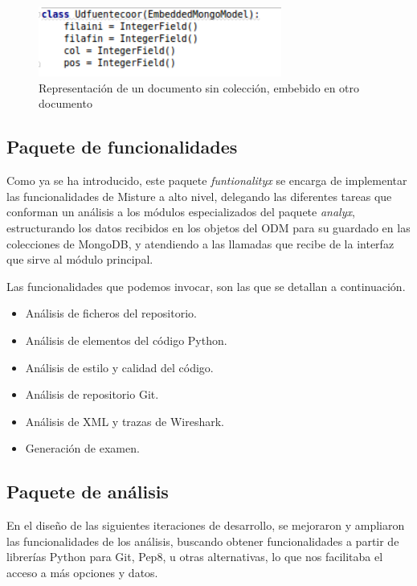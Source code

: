 \begin{figure}[H]
   \centering
   \includegraphics[width=8cm]{img/Selection_027_mongoembdoc}
   \caption{Representación de un documento sin colección, embebido en otro documento}
   \label{figura:mon_emb}
\end{figure}


\subsection{Paquete de funcionalidades} 
\label{subsec:paq_functs}

Como ya se ha introducido, este paquete \textit{funtionalityx} se encarga de implementar las funcionalidades de Misture a alto nivel, delegando las diferentes tareas que conforman un análisis a los módulos especializados del paquete \textit{analyx}, estructurando los datos recibidos en los objetos del ODM para su guardado en las colecciones de MongoDB, y atendiendo a las llamadas que recibe de la interfaz que sirve al módulo principal.


Las funcionalidades que podemos invocar, son las que se detallan a continuación.

\begin{itemize}
\item Análisis de ficheros del repositorio.

\item Análisis de elementos del código Python.

\item Análisis de estilo y calidad del código.

\item Análisis de repositorio Git.

\item Análisis de XML y trazas de Wireshark.

\item Generación de examen.
\end{itemize}


\subsection{Paquete de análisis} 
\label{subsec:paq_anals}


En el diseño de las siguientes iteraciones de desarrollo, se mejoraron y ampliaron las funcionalidades de los análisis, buscando obtener funcionalidades a partir de librerías Python para Git, Pep8, u otras alternativas, lo que nos facilitaba el acceso a más opciones y datos.


